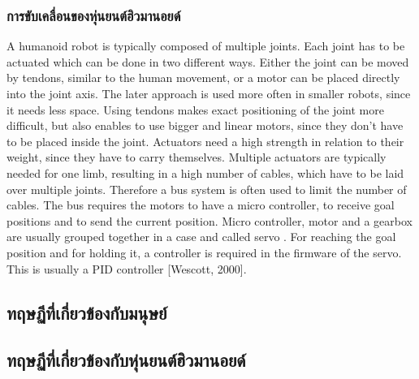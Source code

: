 \subsubsection*{การขับเคลื่อนของหุ่นยนต์ฮิวมานอยด์}
A humanoid robot is typically composed of multiple joints.  Each joint has to be
actuated which can be done in two different ways.  Either the joint can be moved
by tendons, similar to the human movement, or a motor can be placed directly into
the  joint  axis.   The  later  approach  is  used  more  often  in  smaller  robots,  since  it
needs less space.  Using tendons makes exact positioning of the joint more difficult,
but also enables to use bigger and linear motors, since they don’t have to be placed
inside the joint.
Actuators need a high strength in relation to their weight, since they have to carry
themselves.  Multiple actuators are typically needed for one limb, resulting in a high
number of cables, which have to be laid over multiple joints.  Therefore a bus system
is often used to limit the number of cables.  The bus requires the motors to have a
micro controller, to receive goal positions and to send the current position.  Micro
controller, motor and a gearbox are usually grouped together in a case and called
servo
.  For reaching the goal position and for holding it, a controller is required in
the firmware of the servo.  This is usually a PID controller [Wescott, 2000].


\clearpage
\subsection{ทฤษฏีที่เกี่ยวข้องกับมนุษย์}

\subsection{ทฤษฏีที่เกี่ยวข้องกับหุ่นยนต์ฮิวมานอยด์}
